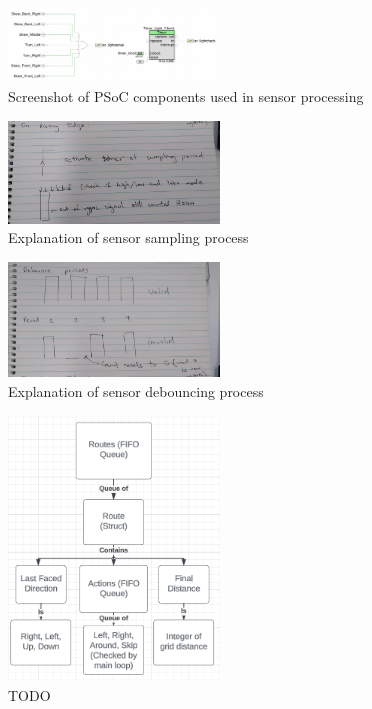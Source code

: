 \documentclass[conference]{IEEEtran}
\begin{document}
\begin{figure}[htbp]
	\centerline{\includegraphics[width=0.5\textwidth]{sensor-psoc.png}}
	\caption{Screenshot of PSoC components used in sensor processing}
	\label{fig:sensor-psoc}
\end{figure}

\begin{figure}[htbp]
	\centerline{\includegraphics[width=0.5\textwidth]{sensor-sampling.png}}
	\caption{Explanation of sensor sampling process}
	\label{fig:sensor-sampling}
\end{figure}

\begin{figure}[htbp]
	\centerline{\includegraphics[width=0.5\textwidth]{sensor-debouncing.png}}
	\caption{Explanation of sensor debouncing process}
	\label{fig:sensor-debouncing}
\end{figure}

\begin{figure}[htbp]
	\centerline{\includegraphics[width=0.5\textwidth]{pathfinding-route-struct.png}}
	\caption{TODO}
	\label{fig:pathfinding-route-struct}
\end{figure}
\end{document}
